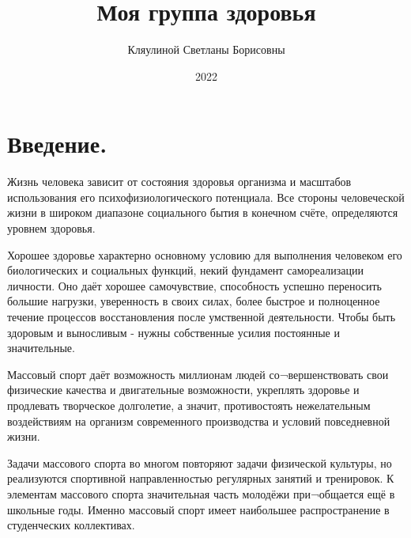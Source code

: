 \documentclass[bachelor, och, referat ]{SCWorks}
\begin{document}

\title{Моя группа здоровья}






\author{Кляулиной Светланы Борисовны}


\satitle{} %

\date{2022}

\maketitle

\section*{Введение.}
Жизнь человека зависит от состояния здоровья организма и масштабов использования его психофизиологического потенциала. Все стороны человеческой жизни в широком диапазоне социального бытия в конечном счёте, определяются уровнем здоровья.

Хорошее здоровье характерно основному условию для выполнения человеком его биологических и социальных функций, некий фундамент самореализации личности. Оно даёт хорошее самочувствие, способность успешно переносить большие нагрузки, уверенность в своих силах, более быстрое и полноценное течение процессов восстановления после умственной деятельности. Чтобы быть здоровым и выносливым - нужны собственные усилия постоянные и значительные.

Массовый спорт даёт возможность миллионам людей со¬вершенствовать свои физические качества и двигательные возможности, укреплять здоровье и продлевать творческое долголетие, а значит, противостоять нежелательным воздействиям на организм современного производства и условий повседневной жизни.

Задачи массового спорта во многом повторяют задачи физической культуры, но реализуются спортивной направленностью регулярных занятий и тренировок. К элементам массового спорта значительная часть молодёжи при¬общается ещё в школьные годы. Именно массовый спорт имеет наибольшее распространение в студенческих коллективах.
\end{document}
